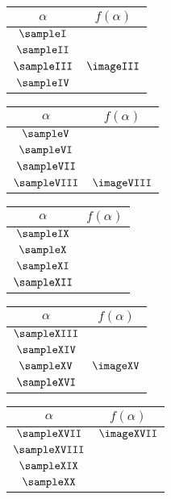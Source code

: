 {	\begin{center}
	\hspace{-1cm}
	\begin{tabular}{|c|c|}\hline
		$\alpha$ & $f(\alpha)$ \\ \hline
		$\sampleI$ & \\ \hline
		$\sampleII$ & \\ \hline
		$\sampleIII$ & $\imageIII$\\ \hline
		$\sampleIV$ & \\ \hline
	\end{tabular}
	\begin{tabular}{|c|c|}\hline
		$\alpha$ & $f(\alpha)$ \\ \hline
		$\sampleV$ & \\ \hline
		$\sampleVI$ & \\ \hline
		$\sampleVII$ & \\ \hline
		$\sampleVIII$ & $\imageVIII$ \\ \hline
	\end{tabular}
	\begin{tabular}{|c|c|}\hline
		$\alpha$ & $f(\alpha)$ \\ \hline
		$\sampleIX$ & \imageIX \\ \hline
		$\sampleX$ & \\ \hline
		$\sampleXI$ & \\ \hline
		$\sampleXII$ & \\ \hline
	\end{tabular}
	\begin{tabular}{|c|c|}\hline
		$\alpha$ & $f(\alpha)$ \\ \hline
		$\sampleXIII$ & \\ \hline
		$\sampleXIV$ & \\ \hline
		$\sampleXV$ & $\imageXV$ \\ \hline
		$\sampleXVI$ & \\ \hline
	\end{tabular}
	\begin{tabular}{|c|c|}\hline
		$\alpha$ & $f(\alpha)$ \\ \hline
		$\sampleXVII$ & $\imageXVII$ \\ \hline
		$\sampleXVIII$ & \\ \hline
		$\sampleXIX$ & \\ \hline
		$\sampleXX$ & \\ \hline
	\end{tabular}
	\end{center}
}{}





